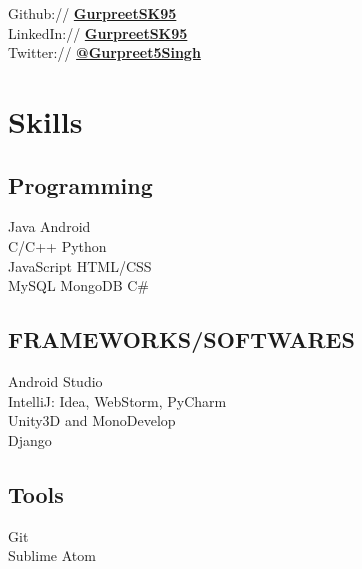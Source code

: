 \documentclass[a4paper]{deedy-resume} %
\begin{document}
\begin{minipage}[t]{0.33\textwidth}
Github:// \href{https://github.com/gurpreetsk95}{\bf GurpreetSK95} \\
LinkedIn:// \href{https://www.linkedin.com/in/GurpreetSK95}{\bf GurpreetSK95} \\
Twitter:// \href{https://twitter.com/@Gurpreet5Singh}{\bf @Gurpreet5Singh} \\

\sectionspace %


\section{Skills}

\subsection{Programming}

\textbullet{} Java \textbullet{} Android\\
\textbullet{} C/C++ \textbullet{} Python \\
\textbullet{} JavaScript \textbullet{} HTML/CSS \\
\textbullet{} MySQL \textbullet{} MongoDB \textbullet{} C\#

\sectionspace %

\subsection{FRAMEWORKS/SOFTWARES}

\textbullet{} Android Studio\\
\textbullet{} IntelliJ: Idea, WebStorm, PyCharm \\
\textbullet{} Unity3D and MonoDevelop \\
\textbullet{} Django 

\sectionspace %

\subsection{Tools}

\textbullet{} Git\\
\textbullet{} Sublime \textbullet{} Atom

\sectionspace %


\end{minipage}
\end{document}
